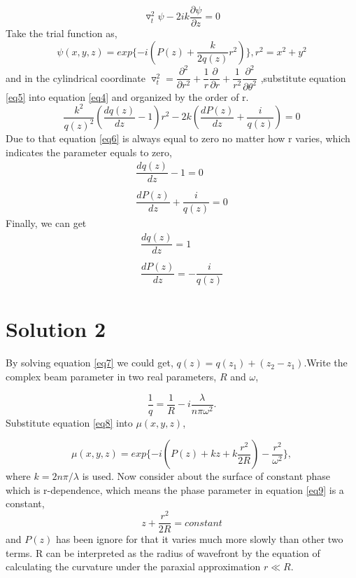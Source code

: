 \documentclass{article}
\begin{document}
\begin{equation}\label{eq4}
\triangledown_t^2\psi-2ik\dfrac{\partial \psi}{\partial z}=0
\end{equation}
Take the trial function as,
\begin{equation}\label{eq5}
\psi(x,y,z)=exp\{-i(P(z)+\dfrac{k}{2q(z)}r^2)\},r^2=x^2+y^2
\end{equation}
and in the cylindrical coordinate $\triangledown_t^2=\dfrac{\partial^2}{\partial r^2}+\dfrac{1}{r} \dfrac{\partial}{\partial r}+\dfrac{1}{r^2}\dfrac{\partial^2}{\partial \theta^2}$ ,substitute equation \ref{eq5} into equation \ref{eq4} and organized by the order of r.
\begin{equation}\label{eq6}
\dfrac{k^2}{q(z)^2}(\dfrac{dq(z)}{dz}-1)r^2-2k(\dfrac{dP(z)}{dz}+\dfrac{i}{q(z)})=0
\end{equation}
Due to that equation \ref{eq6} is always equal to zero no matter how r varies, which indicates the parameter equals to zero, $$\begin{array}{l}
\dfrac{dq(z)}{dz}-1=0 \\
\\
\dfrac{dP(z)}{dz}+\dfrac{i}{q(z)}=0
\end{array}$$
Finally, we can get
\begin{equation}\label{eq7}
\begin{array}{l}
\dfrac{dq(z)}{dz}=1 \\
\\
\dfrac{dP(z)}{dz}=-\dfrac{i}{q(z)}
\end{array}
\end{equation}

\section{Solution 2}
By solving equation \ref{eq7} we could get, $q(z)=q(z_1)+(z_2-z_1)$.Write the complex beam parameter in two real parameters, $R $ and $\omega$,

\begin{equation}\label{eq8}
\dfrac{1}{q}=\dfrac{1}{R}-i\dfrac{\lambda}{n\pi\omega^2}.
\end{equation}
Substitute equation \ref{eq8} into $\mu(x,y,z)$,

\begin{equation}\label{eq9}
\mu(x,y,z)=exp\{-i(P(z)+kz+k\dfrac{r^2}{2R})-\dfrac{r^2}{\omega^2} \},	
\end{equation}
where $k=2n\pi/\lambda$ is used. Now consider about the surface of constant phase which is r-dependence, which means the phase parameter in equation \ref{eq9} is a constant,
\begin{equation}\label{eq10}
z+\dfrac{r^2}{2R}=constant
\end{equation}
and $P(z)$ has been ignore for that it varies much more slowly than other two terms. R can be interpreted as the radius of wavefront by the equation of calculating the curvature under the paraxial approximation $r\ll R$.
\end{document}
